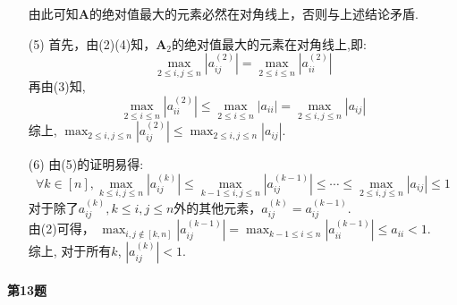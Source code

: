 \documentclass[a4paper]{article}
\begin{document}
\begin{enumerate}
    由此可知$\boldsymbol{A}$的绝对值最大的元素必然在对角线上，否则与上述结论矛盾. 
    \item [(5)]
    首先，由(2)(4)知，$\boldsymbol{A}_2$的绝对值最大的元素在对角线上,即:
    $$\max _{2 \leqslant i, j \leqslant n}\left|a_{i j}^{(2)}\right| = \max _{2 \leqslant i\leqslant n}\left|a_{i i}^{(2)}\right|$$
    再由(3)知,$$\max _{2 \leqslant i\leqslant n}\left|a_{i i}^{(2)}\right|\leq \max _{2 \leqslant i\leqslant n}\left|a_{i i}\right|=\max _{2 \leqslant i, j \leqslant n}\left|a_{i j}\right|$$
    综上, $\max _{2 \leqslant i, j \leqslant n}\left|a_{i j}^{(2)}\right| \leqslant \max _{2 \leqslant i, j \leqslant n}\left|a_{i j}\right|$.
    \item [(6)]
    由(5)的证明易得:$$\forall k \in [n], \max _{k \leqslant i, j \leqslant n}\left|a_{i j}^{(k)}\right| \leqslant \max _{k-1 \leqslant i, j \leqslant n}\left|a_{i j}^{(k-1)}\right| \leqslant \cdots \leqslant \max _{2 \leqslant i, j \leqslant n}\left|a_{i j}\right| \leq 1$$
    对于除了$a_{ij}^{(k)} , k \leqslant i, j \leqslant n$外的其他元素，$a_{ij}^{(k)} = a_{ij}^{(k-1)}$. \\
    由(2)可得， $\max _{i, j \notin [k, n]}\left|a_{i j}^{(k-1)}\right| = \max _{k-1 \leqslant i\leqslant n}\left|a_{i i}^{(k-1)}\right| \leq a_{ii} < 1$. \\
    综上, 对于所有$k$, $\left|a_{i j}^{(k)}\right|<1$.
\end{enumerate}

\paragraph{第13题}~{}
\\
\end{document}
